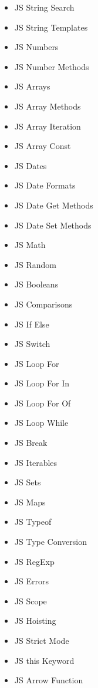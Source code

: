 \documentclass[12pt, letterpaper]{article}
\begin{document}
\begin{enumerate}
\begin{itemize}
\begin{enumerate}
\begin{itemize}
                \item JS String Search
                \item JS String Templates
                \item JS Numbers
                \item JS Number Methods
                \item JS Arrays
                \item JS Array Methods
                \item JS Array Iteration
                \item JS Array Const
                \item JS Dates
                \item JS Date Formats
                \item JS Date Get Methods
                \item JS Date Set Methods
                \item JS Math
                \item JS Random
                \item JS Booleans
                \item JS Comparisons
                \item JS If Else
                \item JS Switch
                \item JS Loop For
                \item JS Loop For In
                \item JS Loop For Of
                \item JS Loop While
                \item JS Break
                \item JS Iterables
                \item JS Sets
                \item JS Maps
                \item JS Typeof
                \item JS Type Conversion
                \item JS RegExp
                \item JS Errors
                \item JS Scope
                \item JS Hoisting
                \item JS Strict Mode
                \item JS this Keyword
                \item JS Arrow Function

\end{itemize}
\end{enumerate}
\end{itemize}
\end{enumerate}
\end{document}
